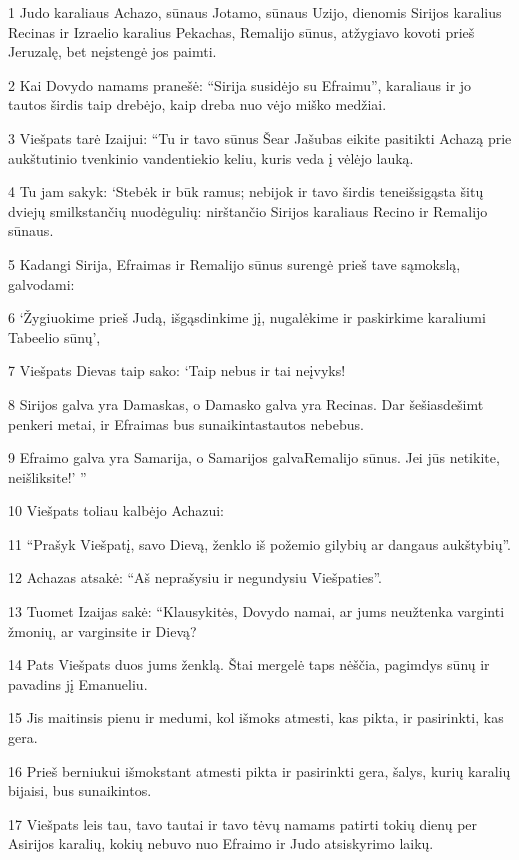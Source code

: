 \par 1 Judo karaliaus Achazo, sūnaus Jotamo, sūnaus Uzijo, dienomis Sirijos karalius Recinas ir Izraelio karalius Pekachas, Remalijo sūnus, atžygiavo kovoti prieš Jeruzalę, bet neįstengė jos paimti. 
\par 2 Kai Dovydo namams pranešė: “Sirija susidėjo su Efraimu”, karaliaus ir jo tautos širdis taip drebėjo, kaip dreba nuo vėjo miško medžiai. 
\par 3 Viešpats tarė Izaijui: “Tu ir tavo sūnus Šear Jašubas eikite pasitikti Achazą prie aukštutinio tvenkinio vandentiekio keliu, kuris veda į vėlėjo lauką. 
\par 4 Tu jam sakyk: ‘Stebėk ir būk ramus; nebijok ir tavo širdis teneišsigąsta šitų dviejų smilkstančių nuodėgulių: nirštančio Sirijos karaliaus Recino ir Remalijo sūnaus. 
\par 5 Kadangi Sirija, Efraimas ir Remalijo sūnus surengė prieš tave sąmokslą, galvodami: 
\par 6 ‘Žygiuokime prieš Judą, išgąsdinkime jį, nugalėkime ir paskirkime karaliumi Tabeelio sūnų’, 
\par 7 Viešpats Dievas taip sako: ‘Taip nebus ir tai neįvyks! 
\par 8 Sirijos galva yra Damaskas, o Damasko galva yra Recinas. Dar šešiasdešimt penkeri metai, ir Efraimas bus sunaikintas­tautos nebebus. 
\par 9 Efraimo galva yra Samarija, o Samarijos galva­Remalijo sūnus. Jei jūs netikite, neišliksite!’ ” 
\par 10 Viešpats toliau kalbėjo Achazui: 
\par 11 “Prašyk Viešpatį, savo Dievą, ženklo iš požemio gilybių ar dangaus aukštybių”. 
\par 12 Achazas atsakė: “Aš neprašysiu ir negundysiu Viešpaties”. 
\par 13 Tuomet Izaijas sakė: “Klausykitės, Dovydo namai, ar jums neužtenka varginti žmonių, ar varginsite ir Dievą? 
\par 14 Pats Viešpats duos jums ženklą. Štai mergelė taps nėščia, pagimdys sūnų ir pavadins jį Emanueliu. 
\par 15 Jis maitinsis pienu ir medumi, kol išmoks atmesti, kas pikta, ir pasirinkti, kas gera. 
\par 16 Prieš berniukui išmokstant atmesti pikta ir pasirinkti gera, šalys, kurių karalių bijaisi, bus sunaikintos. 
\par 17 Viešpats leis tau, tavo tautai ir tavo tėvų namams patirti tokių dienų per Asirijos karalių, kokių nebuvo nuo Efraimo ir Judo atsiskyrimo laikų. 

